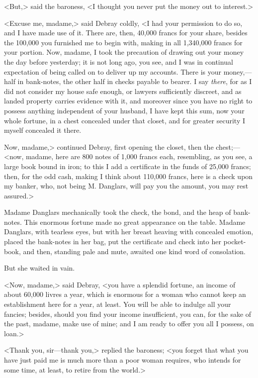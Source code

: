  <But,> said the baroness, <I thought you never put the money out to interest.> 

 <Excuse me, madame,> said Debray coldly, <I had your permission to do so, and I have made use of it. There are, then, 40,000 francs for your share, besides the 100,000 you furnished me to begin with, making in all 1,340,000 francs for your portion. Now, madame, I took the precaution of drawing out your money the day before yesterday; it is not long ago, you see, and I was in continual expectation of being called on to deliver up my accounts. There is your money,—half in bank-notes, the other half in checks payable to bearer. I say \textit{there}, for as I did not consider my house safe enough, or lawyers sufficiently discreet, and as landed property carries evidence with it, and moreover since you have no right to possess anything independent of your husband, I have kept this sum, now your whole fortune, in a chest concealed under that closet, and for greater security I myself concealed it there. 

 Now, madame,> continued Debray, first opening the closet, then the chest;—<now, madame, here are 800 notes of 1,000 francs each, resembling, as you see, a large book bound in iron; to this I add a certificate in the funds of 25,000 francs; then, for the odd cash, making I think about 110,000 francs, here is a check upon my banker, who, not being M. Danglars, will pay you the amount, you may rest assured.> 

 Madame Danglars mechanically took the check, the bond, and the heap of bank-notes. This enormous fortune made no great appearance on the table. Madame Danglars, with tearless eyes, but with her breast heaving with concealed emotion, placed the bank-notes in her bag, put the certificate and check into her pocket-book, and then, standing pale and mute, awaited one kind word of consolation. 

 But she waited in vain. 

 <Now, madame,> said Debray, <you have a splendid fortune, an income of about 60,000 livres a year, which is enormous for a woman who cannot keep an establishment here for a year, at least. You will be able to indulge all your fancies; besides, should you find your income insufficient, you can, for the sake of the past, madame, make use of mine; and I am ready to offer you all I possess, on loan.> 

 <Thank you, sir—thank you,> replied the baroness; <you forget that what you have just paid me is much more than a poor woman requires, who intends for some time, at least, to retire from the world.> 

